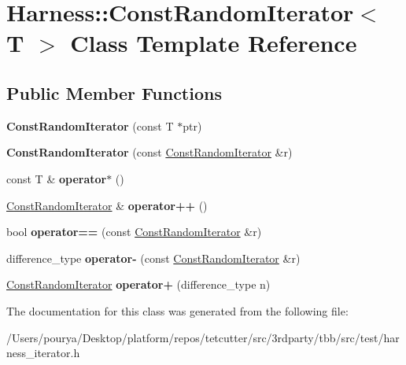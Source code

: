 \hypertarget{classHarness_1_1ConstRandomIterator}{}\section{Harness\+:\+:Const\+Random\+Iterator$<$ T $>$ Class Template Reference}
\label{classHarness_1_1ConstRandomIterator}
\subsection*{Public Member Functions}
\begin{DoxyCompactItemize}
\item 
\hypertarget{classHarness_1_1ConstRandomIterator_a3a447eb7c414074d4f4af9ad5d924b70}{}{\bfseries Const\+Random\+Iterator} (const T $\ast$ptr)\label{classHarness_1_1ConstRandomIterator_a3a447eb7c414074d4f4af9ad5d924b70}

\item 
\hypertarget{classHarness_1_1ConstRandomIterator_a11a31d52e0c8079f6a4510bd0767e57d}{}{\bfseries Const\+Random\+Iterator} (const \hyperlink{classHarness_1_1ConstRandomIterator}{Const\+Random\+Iterator} \&r)\label{classHarness_1_1ConstRandomIterator_a11a31d52e0c8079f6a4510bd0767e57d}

\item 
\hypertarget{classHarness_1_1ConstRandomIterator_a6620e34c802ea8b02727420957493d2c}{}const T \& {\bfseries operator$\ast$} ()\label{classHarness_1_1ConstRandomIterator_a6620e34c802ea8b02727420957493d2c}

\item 
\hypertarget{classHarness_1_1ConstRandomIterator_a650bfbc1e0244f61854035a1cb25b2da}{}\hyperlink{classHarness_1_1ConstRandomIterator}{Const\+Random\+Iterator} \& {\bfseries operator++} ()\label{classHarness_1_1ConstRandomIterator_a650bfbc1e0244f61854035a1cb25b2da}

\item 
\hypertarget{classHarness_1_1ConstRandomIterator_ad01e56756d46f9ef4beb6e6ca7cd60c1}{}bool {\bfseries operator==} (const \hyperlink{classHarness_1_1ConstRandomIterator}{Const\+Random\+Iterator} \&r)\label{classHarness_1_1ConstRandomIterator_ad01e56756d46f9ef4beb6e6ca7cd60c1}

\item 
\hypertarget{classHarness_1_1ConstRandomIterator_a631a6b6f1183766236d5837bb2a3aaa7}{}difference\+\_\+type {\bfseries operator-\/} (const \hyperlink{classHarness_1_1ConstRandomIterator}{Const\+Random\+Iterator} \&r)\label{classHarness_1_1ConstRandomIterator_a631a6b6f1183766236d5837bb2a3aaa7}

\item 
\hypertarget{classHarness_1_1ConstRandomIterator_a606b143bd1999ce09a95ed516a34d1e4}{}\hyperlink{classHarness_1_1ConstRandomIterator}{Const\+Random\+Iterator} {\bfseries operator+} (difference\+\_\+type n)\label{classHarness_1_1ConstRandomIterator_a606b143bd1999ce09a95ed516a34d1e4}

\end{DoxyCompactItemize}


The documentation for this class was generated from the following file\+:\begin{DoxyCompactItemize}
\item 
/\+Users/pourya/\+Desktop/platform/repos/tetcutter/src/3rdparty/tbb/src/test/harness\+\_\+iterator.\+h\end{DoxyCompactItemize}
